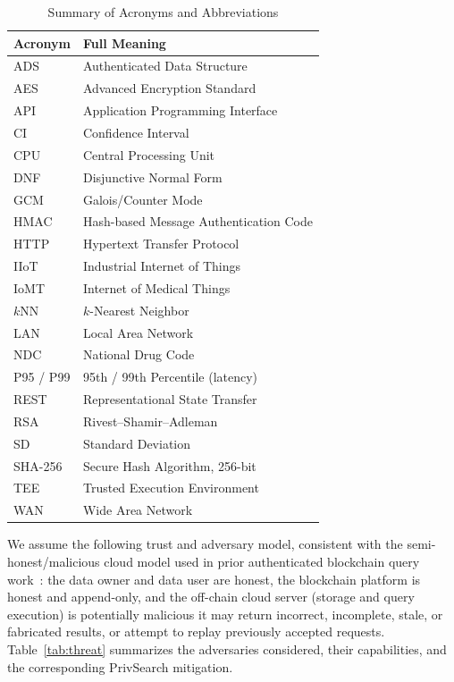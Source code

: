 \begin{table}[t]
\centering
\caption{Summary of Acronyms and Abbreviations}
\label{tab:acronyms}
\small
\begin{tabular}{ll}
\toprule
\textbf{Acronym} & \textbf{Full Meaning} \\
\midrule
ADS & Authenticated Data Structure \\
AES & Advanced Encryption Standard \\
API & Application Programming Interface \\
CI & Confidence Interval \\
CPU & Central Processing Unit \\
DNF & Disjunctive Normal Form \\
GCM & Galois/Counter Mode \\
HMAC & Hash-based Message Authentication Code \\
HTTP & Hypertext Transfer Protocol \\
IIoT & Industrial Internet of Things \\
IoMT & Internet of Medical Things \\
$k$NN & $k$-Nearest Neighbor \\
LAN & Local Area Network \\
NDC & National Drug Code \\
P95 / P99 & 95th / 99th Percentile (latency) \\
REST & Representational State Transfer \\
RSA & Rivest--Shamir--Adleman \\
SD & Standard Deviation \\
SHA-256 & Secure Hash Algorithm, 256-bit \\
TEE & Trusted Execution Environment \\
WAN & Wide Area Network \\
\bottomrule
\end{tabular}
\end{table}
We assume the following trust and adversary model, consistent with the semi-honest/malicious cloud model used in prior authenticated blockchain query work~\cite{Yang,Yin,Wu}: the data owner and data user are honest, the blockchain platform is honest and append-only, and the off-chain cloud server (storage and query execution) is potentially malicious it may return incorrect, incomplete, stale, or fabricated results, or attempt to replay previously accepted requests. Table~\ref{tab:threat} summarizes the adversaries considered, their capabilities, and the corresponding PrivSearch mitigation.
